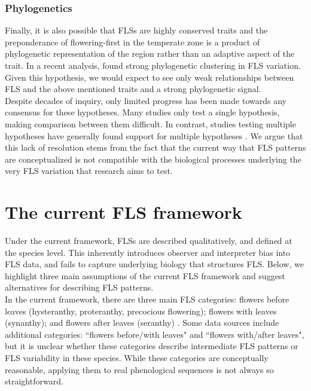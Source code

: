 \documentclass{article}
\begin{document}
\subsubsection*{Phylogenetics} 
\noindent Finally, it is also possible that FLSs are highly conserved traits and the preponderance of flowering-first in the temperate zone is a product of phylogenetic representation of the region rather than an adaptive aspect of the trait. In a recent analysis, \citet{Gougherty2018} found strong phylogenetic clustering in FLS variation. Given this hypothesis, we would expect to see only weak relationships between FLS and the above mentioned traits and a strong phylogenetic signal.\\

\noindent Despite decades of inquiry, only limited progress has been made towards any consensus for these hypotheses. Many studies only test a single hypothesis, making comparison between them difficult. In contrast, studies testing multiple hypotheses have generally found support for multiple hypotheses \citep[see][]{Bolmgren2003,Gougherty2018}. We argue that this lack of resolution stems from the fact that the current way that FLS patterns are conceptualized is not compatible with the biological processes underlying the very FLS variation that research aims to test.

\section*{The current FLS framework}
Under the current framework, FLSs are described qualitatively, and defined at the species level. This inherently introduces observer and interpreter bias into FLS data, and fails to capture underlying biology that structures FLS. Below, we highlight three main assumptions of the current FLS framework and suggest alternatives for describing FLS patterns.\\ %

\noindent In the current framework, there are three main FLS categories: flowers before leaves (hysteranthy, proteranthy, precocious flowering); flowers with leaves (synanthy); and flowers after leaves (seranthy) \citep{Lamont2011, Heinig1899}. Some data sources \citep[e.g.][]{Burns1990,Barnes2004} include additional categories: ``flowers before/with leaves" and ``flowers with/after leaves", but it is unclear whether these categories describe intermediate FLS patterns or FLS variability in these species. While these categories are conceptually reasonable, applying them to real phenological sequences is not always so straightforward.\\
\end{document}
